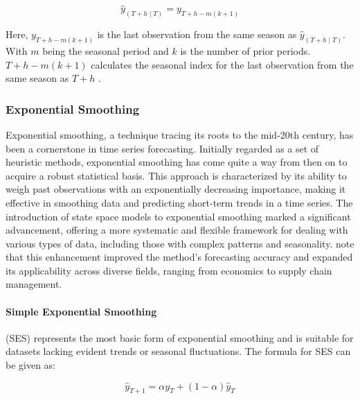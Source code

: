 \documentclass[12pt,a4paper]{article}
\begin{document}
\begin{equation}
  {\hat{y}}_{\left(T+h\middle| T\right)}=y_{T+h-m(k+1)}
  \label{seasonalnaive}
\end{equation}

Here, $y_{T+h-m\left(k+1\right)}$ is the last observation from the same season as ${\hat{y}}_{\left(T+h\middle| T\right)}$. With $m$ being the seasonal period and $k$ is the number of prior periods. $T+h-m\left(k+1\right)$ calculates the seasonal index for the last observation from the same season as $T+h$ \parencite{HyndmanForecasting2021}.  

\subsubsection{Exponential Smoothing}
Exponential smoothing, a technique tracing its roots to the mid-20th century, has been a cornerstone in time series forecasting. Initially regarded as a set of heuristic methods, exponential smoothing has come quite a way from then on to acquire a robust statistical basis. This approach is characterized by its ability to weigh past observations with an exponentially decreasing importance, making it effective in smoothing data and predicting short-term trends in a time series. The introduction of state space models to exponential smoothing marked a significant advancement, offering a more systematic and flexible framework for dealing with various types of data, including those with complex patterns and seasonality. \cite{DEGOOIJER2006443} note that this enhancement improved the method's forecasting accuracy and expanded its applicability across diverse fields, ranging from economics to supply chain management.

\paragraph{Simple Exponential Smoothing}
(SES) represents the most basic form of exponential smoothing and is suitable for datasets lacking evident trends or seasonal fluctuations. The formula for SES can be given as: 

\begin{equation}
  \hat{y}_{T+1} = \alpha y_T + (1-\alpha) \hat{y}_T
  \label{ses}
\end{equation}
\end{document}
